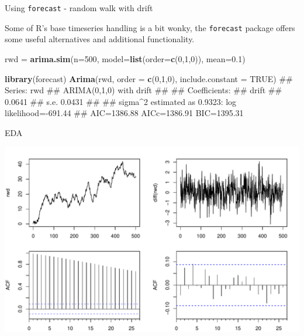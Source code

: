 \documentclass[11pt,ignorenonframetext,]{beamer}
\newenvironment{Shaded}{}{}
\newcommand{\KeywordTok}[1]{\textcolor[rgb]{0.00,0.44,0.13}{\textbf{#1}}}
\newcommand{\DataTypeTok}[1]{\textcolor[rgb]{0.56,0.13,0.00}{#1}}
\newcommand{\DecValTok}[1]{\textcolor[rgb]{0.25,0.63,0.44}{#1}}
\newcommand{\FloatTok}[1]{\textcolor[rgb]{0.25,0.63,0.44}{#1}}
\newcommand{\StringTok}[1]{\textcolor[rgb]{0.25,0.44,0.63}{#1}}
\newcommand{\OtherTok}[1]{\textcolor[rgb]{0.00,0.44,0.13}{#1}}
\newcommand{\NormalTok}[1]{#1}
\let\oldShaded\Shaded
\let\endoldShaded\endShaded
\renewenvironment{Shaded}{\footnotesize\begin{spacing}{0.9}\oldShaded}{\endoldShaded\end{spacing}}
\begin{document}
\begin{frame}[fragile]{Using \texttt{forecast} - random walk with drift}

Some of R's base timeseries handling is a bit wonky, the
\texttt{forecast} package offers some useful alternatives and additional
functionality.

\begin{Shaded}
\begin{Highlighting}[]
\NormalTok{rwd =}\StringTok{ }\KeywordTok{arima.sim}\NormalTok{(}\DataTypeTok{n=}\DecValTok{500}\NormalTok{, }\DataTypeTok{model=}\KeywordTok{list}\NormalTok{(}\DataTypeTok{order=}\KeywordTok{c}\NormalTok{(}\DecValTok{0}\NormalTok{,}\DecValTok{1}\NormalTok{,}\DecValTok{0}\NormalTok{)), }\DataTypeTok{mean=}\FloatTok{0.1}\NormalTok{) }

\KeywordTok{library}\NormalTok{(forecast)}
\KeywordTok{Arima}\NormalTok{(rwd, }\DataTypeTok{order =} \KeywordTok{c}\NormalTok{(}\DecValTok{0}\NormalTok{,}\DecValTok{1}\NormalTok{,}\DecValTok{0}\NormalTok{), }\DataTypeTok{include.constant =} \OtherTok{TRUE}\NormalTok{)}
\NormalTok{## Series: rwd }
\NormalTok{## ARIMA(0,1,0) with drift         }
\NormalTok{## }
\NormalTok{## Coefficients:}
\NormalTok{##        drift}
\NormalTok{##       0.0641}
\NormalTok{## s.e.  0.0431}
\NormalTok{## }
\NormalTok{## sigma^2 estimated as 0.9323:  log likelihood=-691.44}
\NormalTok{## AIC=1386.88   AICc=1386.91   BIC=1395.31}
\end{Highlighting}
\end{Shaded}

\end{frame}

\begin{frame}{EDA}

\includegraphics{Lec9_files/figure-beamer/unnamed-chunk-2-1.pdf}

\end{frame}
\end{document}
